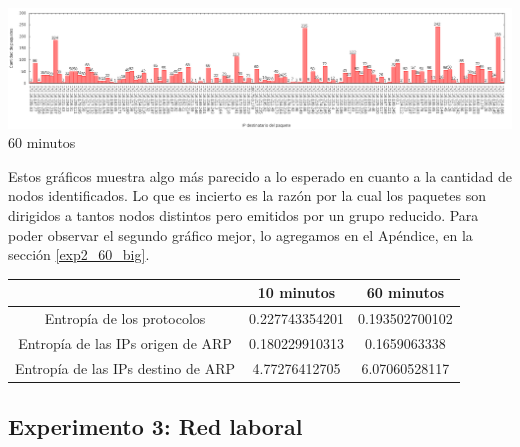 \begin{center}
\includegraphics[width=16cm]{../mediciones/altop-wifi-60/altop60IpsDstArp.png}
60 minutos
\end{center}

Estos gráficos muestra algo más parecido a lo esperado en cuanto a la cantidad de nodos identificados. Lo que es incierto es la razón por la cual
los paquetes son dirigidos a tantos nodos distintos pero emitidos por un grupo reducido.
Para poder observar el segundo gráfico mejor, lo agregamos en el Apéndice, en la sección \ref{exp2_60_big}.

\begin{center}
\begin{tabular}{|c||c|c|}
\hline
 & 10 minutos & 60 minutos \\
\hline
\hline
Entropía de los protocolos & 0.227743354201 & 0.193502700102 \\
\hline
Entropía de las IPs origen de ARP & 0.180229910313 & 0.1659063338 \\
\hline
Entropía de las IPs destino de ARP & 4.77276412705 & 6.07060528117 \\
\hline
\end{tabular}
\end{center}

\subsection{Experimento 3: Red laboral}


